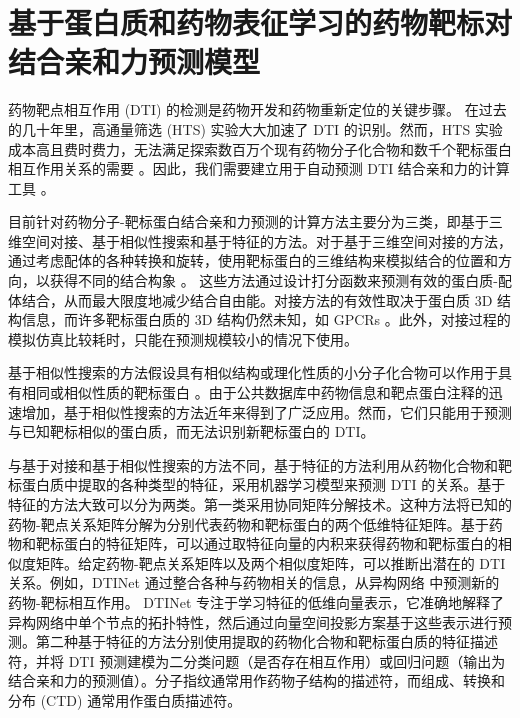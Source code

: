 
\chapter{基于蛋白质和药物表征学习的药物靶标对结合亲和力预测模型}

药物靶点相互作用 (DTI) 的检测是药物开发和药物重新定位的关键步骤。 在过去的几十年里，高通量筛选 (HTS) 实验大大加速了 DTI 的识别。然而，HTS 实验成本高且费时费力，无法满足探索数百万个现有药物分子化合物和数千个靶标蛋白相互作用关系的需要 \cite{n2017design, kapetanovic2008computer}。因此，我们需要建立用于自动预测 DTI 结合亲和力的计算工具 \cite{heifetz2018computational}。

目前针对药物分子-靶标蛋白结合亲和力预测的计算方法主要分为三类，即基于三维空间对接、基于相似性搜索和基于特征的方法。对于基于三维空间对接的方法，通过考虑配体的各种转换和旋转，使用靶标蛋白的三维结构来模拟结合的位置和方向，以获得不同的结合构象 \cite{ragoza2017protein, gowthaman2016darc, verdonk2003improved, paul2016mols}。 这些方法通过设计打分函数来预测有效的蛋白质-配体结合，从而最大限度地减少结合自由能。对接方法的有效性取决于蛋白质 3D 结构信息，而许多靶标蛋白质的 3D 结构仍然未知，如 GPCRs \cite{ballesteros2001g}。此外，对接过程的模拟仿真比较耗时，只能在预测规模较小的情况下使用。

基于相似性搜索的方法假设具有相似结构或理化性质的小分子化合物可以作用于具有相同或相似性质的靶标蛋白 \cite{yamanishi2008prediction, bleakley2009supervised, pahikkala2015toward, he2017simboost}。由于公共数据库中药物信息和靶点蛋白注释的迅速增加，基于相似性搜索的方法近年来得到了广泛应用。然而，它们只能用于预测与已知靶标相似的蛋白质，而无法识别新靶标蛋白的 DTI。

与基于对接和基于相似性搜索的方法不同，基于特征的方法利用从药物化合物和靶标蛋白质中提取的各种类型的特征，采用机器学习模型来预测 DTI 的关系。基于特征的方法大致可以分为两类。第一类采用协同矩阵分解技术\cite{cobanoglu2013predicting, ezzat2016drug, zheng2013collaborative}。这种方法将已知的药物-靶点关系矩阵分解为分别代表药物和靶标蛋白的两个低维特征矩阵。基于药物和靶标蛋白的特征矩阵，可以通过取特征向量的内积来获得药物和靶标蛋白的相似度矩阵。给定药物-靶点关系矩阵以及两个相似度矩阵，可以推断出潜在的 DTI 关系。例如，DTINet 通过整合各种与药物相关的信息，从异构网络 \cite{luo2017network} 中预测新的药物-靶标相互作用。 DTINet 专注于学习特征的低维向量表示，它准确地解释了异构网络中单个节点的拓扑特性，然后通过向量空间投影方案基于这些表示进行预测。第二种基于特征的方法分别使用提取的药物化合物和靶标蛋白质的特征描述符，并将 DTI 预测建模为二分类问题（是否存在相互作用）或回归问题（输出为结合亲和力的预测值）\cite{cheng2012prediction, wang2011computational, he2010predicting}。分子指纹通常用作药物子结构的描述符，而组成、转换和分布 (CTD) 通常用作蛋白质描述符。

